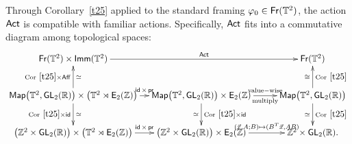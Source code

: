 \begin{observation}\label{t4}
Through Corollary~\ref{t25} applied to the standard framing $\varphi_0 \in \operatorname{\sf Fr}(\mathbb T^2)$, the action $\operatorname{\sf Act}$ is compatible with familiar actions.
Specifically, $\operatorname{\sf Act}$ fits into a commutative diagram among topological spaces:
\[
\xymatrix@C=1em{
\Fr(\TT^2)
\times
\Imm(\TT^2)
\ar[rrr]^-{\Act}
&
&&
\Fr(\TT^2)
\\
\Map\bigl( \TT^2 , \GL_2(\RR) \bigr)
\times
\bigl(
\TT^2 \rtimes \EZ
\bigr)
\ar[u]^-{ {\rm Cor}~\ref{t25} \times \Aff}_-{\simeq}
\ar[r]^-{ \id \times \pr }
\ar[d]_-{ {\rm Cor}~\ref{t25} \times \id}^-{\simeq}
&
\Map\bigl( \TT^2 , \GL_2(\RR) \bigr)
\times
\EZ 
\ar[rr]^-{\rm value-wise}_-{\rm multiply}
\ar[d]^-{{\rm Cor}~\ref{t25} \times \id}_-{\simeq}
&&
\Map\bigl( \TT^2 , \GL_2(\RR) \bigr)
\ar[d]^-{{\rm Cor}~\ref{t25}}_-{\simeq}
\ar[u]_-{{\rm Cor}~\ref{t25}}^-{\cong}
\\
\bigl( \ZZ^2 \times \GL_2(\RR) \bigr)
\times
\bigl(
\TT^2 \rtimes \EZ
\bigr)
\ar[r]^-{ \id \times \pr }
&
\bigl( \ZZ^2\times  \GL_2(\RR) \bigr)
\times
\EZ 
\ar[rr]^-{(\vec{x},A;B)\mapsto (B^T \vec{x},AB)}
&&
\ZZ^2 \times \GL_2(\RR) 
.
}
\]


\end{observation}










